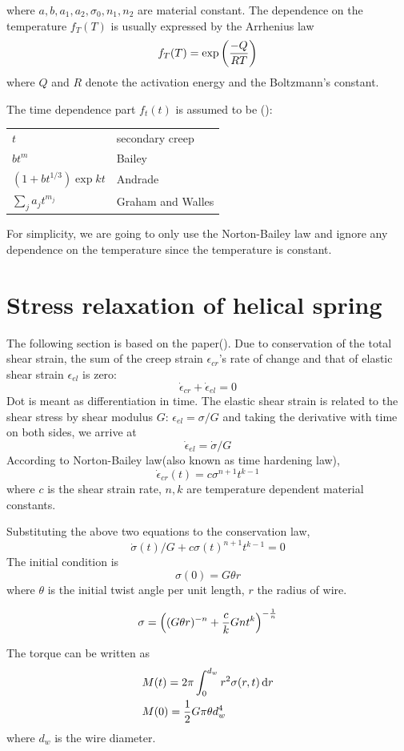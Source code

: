 \documentclass[10pt]{article}
\begin{document}
where $a,b,a_1,a_2,\sigma_0,n_1,n_2$ are material constant. The dependence on the temperature $f_T(T)$ is usually expressed by the Arrhenius law
\[
f_T(T) = \exp \left( {-Q\over RT}\right)
\]
where $Q$ and $R$ denote the activation energy and the Boltzmann's constant.

The time dependence part $f_t(t)$ is assumed to be (\cite{Ch2000}):

\begin{tabular}{ll}
$t$ & secondary creep \\
$bt^m$ & Bailey \\
$(1+bt^{1/3})\exp{kt}$ & Andrade\\
$\sum_j a_j t^{m_j}$ & Graham and Walles
\end{tabular}

For simplicity, we are going to only use the Norton-Bailey law and ignore any dependence on the temperature since the temperature is constant.
\section{Stress relaxation of helical spring}
The following section is based on the paper(\cite{SiAt1970}). Due to conservation of the total shear strain, the sum of the creep strain $\epsilon_{cr}$'s rate of change and that of elastic shear strain $\epsilon_{el}$ is zero:
\[
\dot{\epsilon}_{cr} + \dot{\epsilon}_{el} = 0
\]
Dot is meant as differentiation in time. The elastic shear strain is related to the shear stress by shear modulus $G$: $\epsilon_{el} = \sigma/G$ and taking the derivative with time on both sides, we arrive at
\[
\dot{\epsilon}_{el} = \dot{\sigma}/G
\]
According to Norton-Bailey law(also known as time hardening law),
\begin{equation} \label{eq:N-B}
\dot{\epsilon}_{cr}(t)=c\sigma^{n+1} t^{k-1}
\end{equation}
where $c$ is the shear strain rate, $n,k$ are temperature dependent material constants.

Substituting the above two equations to the conservation law,
\begin{equation} \label{eq:diff}
\dot{\sigma}(t)/G+c\sigma(t)^{n+1} t^{k-1}=0
\end{equation}
The initial condition is
\[
\sigma (0) = G\theta r
\]
where $\theta$ is the initial twist angle per unit length, $r$ the radius of wire.

\[
\sigma = \left( (G\theta r)^{-n} + {c\over k} Gnt^k \right)^{-{1\over n}}
\]

The torque can be written as
\begin{align*}
&M(t) = 2\pi \int_0^{d_w} r^2 \sigma(r,t)\,\mathrm{d} r\\
&M(0)={1\over 2} G\pi\theta d_w^4
\end{align*}
where $d_w$ is the wire diameter.
\end{document}
